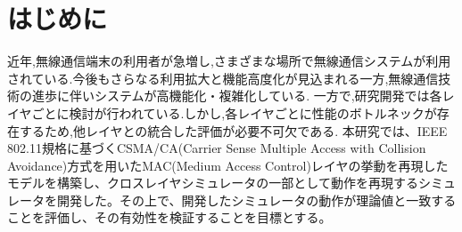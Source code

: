 \documentclass[a4paper, 10pt]{ltjsarticle}
\begin{document}
\setlength{\columnsep}{7.5mm}

\twocolumn[
    \begin{center}
        {\vspace{-1em}}

        {\fontsize{15pt}{15pt}\selectfont{クロスレイヤシミュレータにおける無線LAN評価モデルの検討}}

        {\vspace{1.3em}}

        {\fontsize{13pt}{13pt}\selectfont{A Study of a Wireless LAN Evaluation Model in a Cross-Layer Simulator}}
    \end{center}

    \vspace{0.1em}

    \begin{flushright}
      {\fontsize{11pt}{11pt}\selectfont{T5-16 \, 下沢亮太郎}}
      \\
      {\fontsize{11pt}{11pt}\selectfont{指導教員 \, 設樂勇}}
    \end{flushright}

    \vspace{1em}

    \thispagestyle{empty}
]

\section{はじめに}


近年,無線通信端末の利用者が急増し,さまざまな場所で無線通信システムが利用されている.今後もさらなる利用拡大と機能高度化が見込まれる一方,無線通信技術の進歩に伴いシステムが高機能化・複雑化している.
一方で,研究開発では各レイヤごとに検討が行われている.しかし,各レイヤごとに性能のボトルネックが存在するため,他レイヤとの統合した評価が必要不可欠である.
本研究では、IEEE 802.11規格に基づくCSMA/CA(Carrier Sense Multiple Access with Collision Avoidance)方式を用いたMAC(Medium Access Control)レイヤの挙動を再現したモデルを構築し、クロスレイヤシミュレータの一部として動作を再現するシミュレータを開発した。その上で、開発したシミュレータの動作が理論値と一致することを評価し、その有効性を検証することを目標とする。
\end{document}
